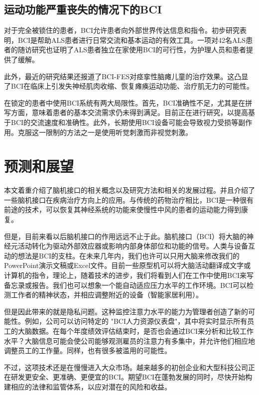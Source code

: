 \documentclass[UTF8,a4paper]{ctexart}
\begin{document}
\subsection{运动功能严重丧失的情况下的BCI}
对于完全被锁住的患者，BCI允许患者向外部世界传达信息和指令。初步研究表明，BCI是帮助ALS患者进行日常交流和基本运动的有效工具\cite{doi:10.1080/2326263X.2013.876724,kim2016clinical,wolpaw2018independent,carelli2017brain}。一项对42名ALS患者的随访研究也证明了ALS患者独立在家使用BCI的可行性，为护理人员和患者提供了缓解\cite{wolpaw2018independent}。
\par 
此外，最近的研究结果还报道了BCI-FES对痉挛性脑瘫儿童的治疗效果。这凸显了BCI在临床上引发失神经肌肉收缩、恢复瘫痪运动功能、治疗肌无力的可能性\cite{kim2016clinical}。
\par
在锁定的患者中使用BCI系统有两大局限性。首先，BCI准确性不足，尤其是在拼写方面，意味着患者的基本交流需求仍未得到满足。目前正在进行研究，以提高基于BCI的交流速度和准确性\cite{santhanam2006high}。此外，长期使用BCI设备可能会导致视力受损等副作用。克服这一限制的方法之一是使用听觉刺激而非视觉刺激\cite{wolpaw2018independent}。

\section{预测和展望}
本文着重介绍了脑机接口的相关概念以及研究方法和相关的发展过程。并且介绍了一些脑机接口在疾病治疗方向上的应用。与传统的药物治疗相比，BCI是一种很有前途的技术，可以恢复其神经系统的功能来使慢性中风的患者的运动能力得到康复。
\par 
但是，目前来看以后脑机接口的作用远远不止于此。脑机接口（BCI）将大脑的神经元活动转化为驱动外部效应器或影响内部身体部位和功能的信号。人类与设备互动的想法是BCI的支柱。在未来几年内，我们也许可以只用大脑来修改我们的PowerPoint演示文稿或Excel文件。目前一些原型机可以将大脑活动翻译成文字或计算机的指令，理论上，随着技术的进步，我们将看到人们在工作中使用BCI来写备忘录或报告。我们也可以想象一个能自动适应压力水平的工作环境。BCI可以检测工作者的精神状态，并相应调整附近的设备（智能家居利用）。
\par
但是因此带来的就是隐私问题。这种监控注意力水平的能力为管理者创造了新的可能性。例如，公司可以访问特定的 "BCI人力资源仪表盘"，其中将实时显示所有员工的大脑数据。在每个年度绩效评估结束时，是否也会通过BCI来分析和比较工作水平？大脑信息可能会使公司能够观测雇员的注意力有多集中，并允许他们相应地调整员工的工作量。同样，也有很多被滥用的可能性。
\par
不过，这项技术还是在慢慢进入大众市场。越来越多的初创企业和大型科技公司正在研发更安全、更准确、更便宜的BCI。期望BCI在蓬勃发展的同时，尽快开始构建相应的法律和监管体系，以应对潜在的风险和收益。


\renewcommand{\refname}{参考文献}


\clearpage
\end{document}
